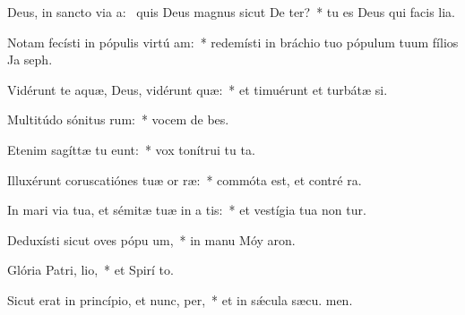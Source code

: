 \item Deus, in sancto via a:~\pscross{} quis Deus magnus sicut De ter?~* tu es Deus qui facis lia.
\item Notam fecísti in pópulis virtú am:~* redemísti in bráchio tuo pópulum tuum fílios Ja  seph.
\item Vidérunt te aquæ, Deus, vidérunt  quæ:~* et timuérunt et turbátæ  si.
\item Multitúdo sónitus rum:~* vocem de bes.
\item Etenim sagíttæ tu eunt:~* vox tonítrui tu  ta.
\item Illuxérunt coruscatiónes tuæ or ræ:~* commóta est, et contré ra.
\item In mari via tua, et sémitæ tuæ in a tis:~* et vestígia tua non tur.
\item Deduxísti sicut oves pópu um,~* in manu Móy  aron.
\item Glória Patri,  lio,~* et Spirí to.
\item Sicut erat in princípio, et nunc,  per,~* et in sǽcula sæcu. men.
